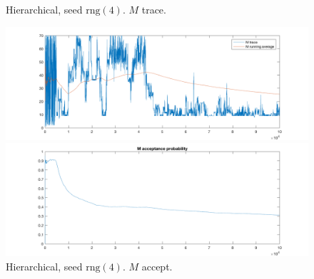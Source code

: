 \documentclass{siamart1116}
\begin{document}
\begin{figure}[!htb]
\begin{minipage}{0.48\textwidth}
    \centering
    \caption{\label{fig:moons_hier2_M_trace} Hierarchical, seed $\text{rng}(4)$. $M$ trace.}
    \includegraphics[width=\linewidth]{moons/hier2/M_trace.png}
\end{minipage} \hfill
\begin{minipage}{0.48\textwidth}
    \centering
    \caption{\label{fig:moons_hier2_M_accept} Hierarchical, seed $\text{rng}(4)$. $M$ accept.}
    \includegraphics[width=\linewidth]{moons/hier2/M_accept.png}
\end{minipage}
\end{figure}



\end{document}
